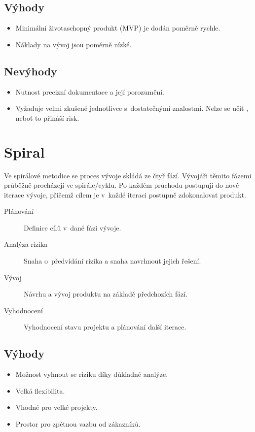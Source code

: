 \documentclass[thesis=M,czech]{FITthesis}[2019/12/23]
\begin{document}
\subsection*{Výhody}
\begin{itemize}
    \item Minimální životaschopný produkt (MVP) je dodán poměrně rychle.
    \item Náklady na vývoj jsou poměrně nízké.
\end{itemize}

\subsection*{Nevýhody}
\begin{itemize}
    \item Nutnost precizní dokumentace a její porozumění.
    \item Vyžaduje velmi zkušené jednotlivce s~dostatečnými znalostmi. Nelze se učit , neboť to přináší risk.
\end{itemize}

\section{Spiral \cite{spiral}}
Ve spirálové metodice se proces vývoje skládá ze čtyř fází. Vývojáři těmito fázemi průběžně procházejí ve spirále/cyklu. Po každém průchodu postupují do nové iterace vývoje, přičemž cílem je v~každé iteraci postupně zdokonalovat produkt.

\begin{description}
    \item[Plánování] Definice cílů v~dané fázi vývoje.
    \item[Analýza rizika] Snaha o~předvídání rizika a snaha navrhnout jejich řešení.
    \item[Vývoj] Návrhu a vývoj produktu na základě předchozích fází.
    \item[Vyhodnocení] Vyhodnocení stavu projektu a plánování další iterace.
\end{description}

\subsection*{Výhody}
\begin{itemize}
    \item Možnost vyhnout se riziku díky důkladné analýze.
    \item Velká flexibilita.
    \item Vhodné pro velké projekty.
    \item Prostor pro zpětnou vazbu od zákazníků.
\end{itemize} 
\end{document}
